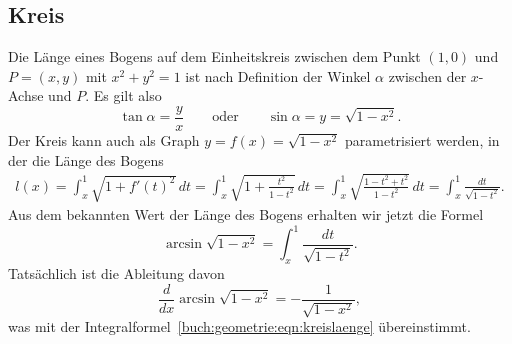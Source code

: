 \subsection{Kreis}
Die Länge eines Bogens auf dem Einheitskreis zwischen dem Punkt
$(1,0)$ und $P=(x,y)$ mit $x^2+y^2=1$ ist nach Definition der
Winkel $\alpha$ zwischen der $x$-Achse und $P$.
Es gilt also
\[
\tan\alpha = \frac{y}{x}
\qquad\text{oder}\qquad
\sin\alpha = y = \sqrt{1-x^2}.
\]
Der Kreis kann auch als Graph $y=f(x)=\sqrt{1-x^2}$ parametrisiert werden,
in der die Länge des Bogens 
\begin{align*}
l(x)
=
\int_x^1 \sqrt{1+f'(t)^2}\,dt
=
\int_x^1 \sqrt{1+\frac{t^2}{1-t^2}}\,dt
=
\int_x^1 \sqrt{\frac{1-t^2+t^2}{1-t^2}}\,dt
=
\int_x^1 \frac{dt}{\sqrt{1-t^2}}.
\end{align*}
Aus dem bekannten Wert der Länge des Bogens erhalten wir jetzt die
Formel
\begin{equation}
\arcsin \sqrt{1-x^2} = \int_x^1 \frac{dt}{\sqrt{1-t^2}}.
\label{buch:geometrie:eqn:kreislaenge} 
\end{equation}
Tatsächlich ist die Ableitung davon
\[
\frac{d}{dx}\arcsin\sqrt{1-x^2}
=
-\frac{1}{\sqrt{1-x^2}},
\]
was mit der Integralformel~\ref{buch:geometrie:eqn:kreislaenge} 
übereinstimmt.

